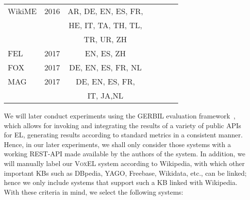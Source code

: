 \documentclass{llncs}
\newcommand{\cmark}{\ding{51}}%
\newcommand{\xmark}{\ding{55}}%
\begin{document}
\begin{table}[t]
\begin{tabular}{lcccccr}
		WikiME \cite{Cross-Lingual-Wikifier-tsai2016cross} & 2016 & AR, DE, EN, ES, FR,&\cmark&\cmark&\xmark&\xmark\\
		& &HE, IT, TA, TH, TL,&&&\\
		& &TR, UR, ZH&&&\\\midrule		
		
		FEL~\cite{FEL-pappu2017lightweight}& 2017 &EN, ES, ZH&\cmark&\xmark&\cmark&\xmark\\\midrule
        
		FOX~\cite{fox2017}&2017&DE, EN, ES, FR, NL&\cmark&\cmark&\cmark&\cmark\\\midrule
        
        MAG \cite{mag2017}& 2017 & DE, EN, ES, FR,&\xmark&\cmark&\cmark&\cmark\\
		& & IT, JA,NL&&&\\
		
		\bottomrule
	\end{tabular}
\end{table}

We will later conduct experiments using the GERBIL evaluation framework~\cite{gerbil-2015}, which allows for invoking and integrating the results of a variety of public APIs for EL, generating results according to standard metrics in a consistent manner. Hence, in our later experiments, we shall only consider those systems with a working REST-API made available by the authors of the system. In addition, we will manually label our \textsc{VoxEL} system according to Wikipedia, with which other important KBs such as DBpedia, YAGO, Freebase, Wikidata, etc., can be linked; hence we only include systems that support such a KB linked with Wikipedia. With these criteria in mind, we select the following systems: 
\end{document}
